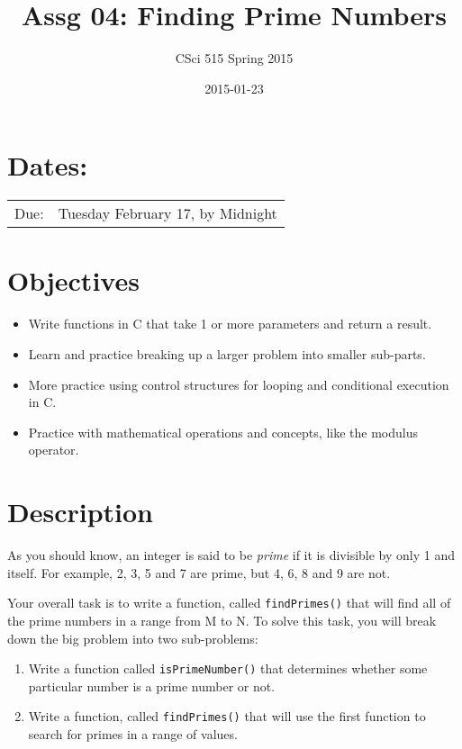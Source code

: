 \documentclass[11pt]{article}
\title{Assg 04: Finding Prime Numbers}
\author{CSci 515 Spring 2015}
\date{2015-01-23}
\begin{document}
\maketitle


\section*{Dates:}
\label{sec-1}


\begin{center}
\begin{tabular}{ll}
 Due:  &  Tuesday February 17, by Midnight  \\
\end{tabular}
\end{center}
\section*{Objectives}
\label{sec-2}

\begin{itemize}
\item Write functions in C that take 1 or more parameters and return a result.
\item Learn and practice breaking up a larger problem into smaller sub-parts.
\item More practice using control structures for looping and conditional
  execution in C.
\item Practice with mathematical operations and concepts, like the modulus
  operator.
\end{itemize}
\section*{Description}
\label{sec-3}

As you should know, an integer is said to be \emph{prime} if it is
divisible by only 1 and itself.  For example, 2, 3, 5 and 7 are
prime, but 4, 6, 8 and 9 are not.

Your overall task is to write a function, called \verb~findPrimes()~ that
will find all of the prime numbers in a range from M to N.  To
solve this task, you will break down the big problem into two
sub-problems:

\begin{enumerate}
\item Write a function called \verb~isPrimeNumber()~ that determines whether
   some particular number is a prime number or not.
\item Write a function, called \verb~findPrimes()~ that will use the first
   function to search for primes in a range of values.
\end{enumerate}
\end{document}
